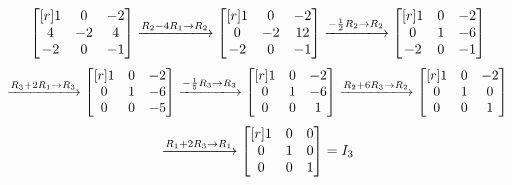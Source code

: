 \documentclass{article}
\theoremstyle{definition}
\newenvironment{solution}[1][]{\begin{replacementsoln}}{\end{replacementsoln}}
\begin{document}
\begin{solution}
  \[
    \begin{bmatrix}[r]
      1&0&-2\\
      4&-2&4\\
      -2&0&-1\\
      \end{bmatrix}\xlongrightarrow{R_2 - 4R_1 \to R_2}\begin{bmatrix}[r]
        1&0&-2\\
        0&-2&12\\
        -2&0&-1\\
        \end{bmatrix}\xlongrightarrow{-\frac{1}{2}R_2 \to R_2}\begin{bmatrix}[r]
          1&0&-2\\
          0&1&-6\\
          -2&0&-1\\
          \end{bmatrix}
  \]
  \[
    \xlongrightarrow{R_3 + 2R_1 \to R_3} \begin{bmatrix}[r]
      1&0&-2\\
      0&1&-6\\
      0&0&-5\\
      \end{bmatrix}\xlongrightarrow{-\frac{1}{5}R_3 \to R_3}\begin{bmatrix}[r]
        1&0&-2\\
        0&1&-6\\
        0&0&1\\
        \end{bmatrix}\xlongrightarrow{R_2 +6R_3 \to R_2}\begin{bmatrix}[r]
        1&0&-2\\
        0&1&0\\
        0&0&1\\
        \end{bmatrix}
  \]
  \[
    \xlongrightarrow{R_1 +2R_3 \to R_1}\begin{bmatrix}[r]
      1&0&0\\
      0&1&0\\
      0&0&1\\
      \end{bmatrix}=I_3
  \]

\end{solution}
\end{document}
